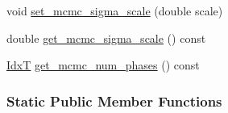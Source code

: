 \begin{DoxyCompactItemize}
\item 
void \hyperlink{classmappel_1_1MCMCAdaptorBase_aa6b8eea136bf1f34f0c50bf8d1937a58}{set\+\_\+mcmc\+\_\+sigma\+\_\+scale} (double scale)
\item 
double \hyperlink{classmappel_1_1MCMCAdaptorBase_a9de5ee52bbf5c8fd3c1e3bd00836801a}{get\+\_\+mcmc\+\_\+sigma\+\_\+scale} () const 
\item 
\hyperlink{namespacemappel_ab17ec0f30b61ece292439d7ece81d3a8}{IdxT} \hyperlink{classmappel_1_1MCMCAdaptorBase_adb9997f1dc774f3a169c61cdb730a85f}{get\+\_\+mcmc\+\_\+num\+\_\+phases} () const 
\end{DoxyCompactItemize}
\subsubsection*{Static Public Member Functions}
